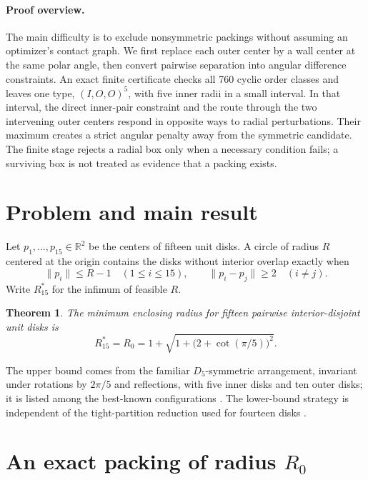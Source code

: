\documentclass[11pt]{article}
\newtheorem{theorem}{Theorem}[section]
\theoremstyle{definition}
\begin{document}
\paragraph{Proof overview.}
The main difficulty is to exclude nonsymmetric packings without assuming an optimizer's contact graph. We first replace each outer center by a wall center at the same polar angle, then convert pairwise separation into angular difference constraints. An exact finite certificate checks all 760 cyclic order classes and leaves one type, $(I,O,O)^5$, with five inner radii in a small interval. In that interval, the direct inner-pair constraint and the route through the two intervening outer centers respond in opposite ways to radial perturbations. Their maximum creates a strict angular penalty away from the symmetric candidate. The finite stage rejects a radial box only when a necessary condition fails; a surviving box is not treated as evidence that a packing exists.

\section{Problem and main result}

Let $p_1,\ldots,p_{15}\in\mathbb R^2$ be the centers of fifteen unit disks. A circle of radius $R$ centered at the origin contains the disks without interior overlap exactly when
\begin{equation}\label{eq:feas}
  \lVert p_i\rVert\le R-1 \quad(1\le i\le15),\qquad
  \lVert p_i-p_j\rVert\ge2 \quad(i\ne j).
\end{equation}
Write $R_{15}^*$ for the infimum of feasible $R$.

\begin{theorem}\label{thm:main}
The minimum enclosing radius for fifteen pairwise interior-disjoint unit disks is
\[
 R_{15}^*=R_0=1+\sqrt{1+\bigl(2+\cot(\pi/5)\bigr)^2}.
\]
\end{theorem}

The upper bound comes from the familiar $D_5$-symmetric arrangement, invariant under rotations by $2\pi/5$ and reflections, with five inner disks and ten outer disks; it is listed among the best-known configurations \cite{GrahamEtAl1998,Packomania}. The lower-bound strategy is independent of the tight-partition reduction used for fourteen disks \cite{EF2024}.

\section{An exact packing of radius \texorpdfstring{$R_0$}{R0}}\label{sec:construction}
\end{document}
